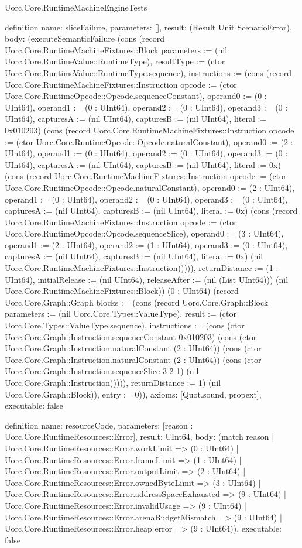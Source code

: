 \begin{lexlean}{Uorc.Core.RuntimeMachineEngineTests}
\begin{semanticmodule}
definition{
  name: sliceFailure,
  parameters: [],
  result: (Result Unit ScenarioError),
  body: (executeSemanticFailure (cons (record Uorc.Core.RuntimeMachineFixtures::Block {parameters := (nil Uorc.Core.RuntimeValue::RuntimeType), resultType := (ctor Uorc.Core.RuntimeValue::RuntimeType.sequence), instructions := (cons (record Uorc.Core.RuntimeMachineFixtures::Instruction {opcode := (ctor Uorc.Core.RuntimeOpcode::Opcode.sequenceConstant), operand0 := (0 : UInt64), operand1 := (0 : UInt64), operand2 := (0 : UInt64), operand3 := (0 : UInt64), capturesA := (nil UInt64), capturesB := (nil UInt64), literal := 0x010203}) (cons (record Uorc.Core.RuntimeMachineFixtures::Instruction {opcode := (ctor Uorc.Core.RuntimeOpcode::Opcode.naturalConstant), operand0 := (2 : UInt64), operand1 := (0 : UInt64), operand2 := (0 : UInt64), operand3 := (0 : UInt64), capturesA := (nil UInt64), capturesB := (nil UInt64), literal := 0x}) (cons (record Uorc.Core.RuntimeMachineFixtures::Instruction {opcode := (ctor Uorc.Core.RuntimeOpcode::Opcode.naturalConstant), operand0 := (2 : UInt64), operand1 := (0 : UInt64), operand2 := (0 : UInt64), operand3 := (0 : UInt64), capturesA := (nil UInt64), capturesB := (nil UInt64), literal := 0x}) (cons (record Uorc.Core.RuntimeMachineFixtures::Instruction {opcode := (ctor Uorc.Core.RuntimeOpcode::Opcode.sequenceSlice), operand0 := (3 : UInt64), operand1 := (2 : UInt64), operand2 := (1 : UInt64), operand3 := (0 : UInt64), capturesA := (nil UInt64), capturesB := (nil UInt64), literal := 0x}) (nil Uorc.Core.RuntimeMachineFixtures::Instruction))))), returnDistance := (1 : UInt64), initialRelease := (nil UInt64), releaseAfter := (nil (List UInt64))}) (nil Uorc.Core.RuntimeMachineFixtures::Block)) (0 : UInt64) (record Uorc.Core.Graph::Graph {blocks := (cons (record Uorc.Core.Graph::Block {parameters := (nil Uorc.Core.Types::ValueType), result := (ctor Uorc.Core.Types::ValueType.sequence), instructions := (cons (ctor Uorc.Core.Graph::Instruction.sequenceConstant 0x010203) (cons (ctor Uorc.Core.Graph::Instruction.naturalConstant (2 : UInt64)) (cons (ctor Uorc.Core.Graph::Instruction.naturalConstant (2 : UInt64)) (cons (ctor Uorc.Core.Graph::Instruction.sequenceSlice 3 2 1) (nil Uorc.Core.Graph::Instruction))))), returnDistance := 1}) (nil Uorc.Core.Graph::Block)), entry := 0})),
  axioms: [Quot.sound, propext],
  executable: false
}

definition{
  name: resourceCode,
  parameters: [reason : Uorc.Core.RuntimeResources::Error],
  result: UInt64,
  body: (match reason
    | Uorc.Core.RuntimeResources::Error.workLimit => (0 : UInt64)
    | Uorc.Core.RuntimeResources::Error.frameLimit => (1 : UInt64)
    | Uorc.Core.RuntimeResources::Error.outputLimit => (2 : UInt64)
    | Uorc.Core.RuntimeResources::Error.ownedByteLimit => (3 : UInt64)
    | Uorc.Core.RuntimeResources::Error.addressSpaceExhausted => (9 : UInt64)
    | Uorc.Core.RuntimeResources::Error.invalidUsage => (9 : UInt64)
    | Uorc.Core.RuntimeResources::Error.arenaBudgetMismatch => (9 : UInt64)
    | Uorc.Core.RuntimeResources::Error.heap error => (9 : UInt64)),
  executable: false
}


\end{semanticmodule}
\end{lexlean}
